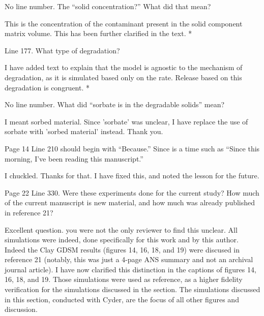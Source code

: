 \documentclass[answers,12pt]{exam}
\begin{document}
\begin{questions}
\question No line number. The ``solid concentration?'' What did that mean?
\begin{solution}
This is the concentration of the contaminant present in the solid component 
        matrix volume. This has been further clarified in the text.
        {\color{red}*}
\end{solution}
 

\question Line 177. What type of degradation?
\begin{solution}
        I have added text to explain that the model is agnostic to the 
        mechanism of degradation, as it is simulated based only 
        on the rate.  Release based on this degradation is congruent.
        {\color{red}*}
\end{solution}

 

\question No line number. What did ``sorbate is in the degradable solids'' mean?
\begin{solution}
I meant sorbed material. Since 'sorbate' was unclear, I have replace the use of 
sorbate with 'sorbed material' instead. Thank you.
\end{solution}
 

\question Page 14 Line 210 should begin with ``Because.'' Since is a time such 
as ``Since this morning, I've been reading this manuscript.''
\begin{solution}
I chuckled. Thanks for that. I have fixed this, and noted the lesson for the future. 
\end{solution}

 

\question Page 22 Line 330. Were these experiments done for the current study? How much of the current manuscript is new material, and how much was already published in reference 21?
\begin{solution}
Excellent question. you were not the only reviewer to find this unclear. All 
        simulations were indeed, done specifically for this work and by this 
        author. Indeed the Clay GDSM results (figures 14, 16, 18, and 19) 
        were discused in reference 21 (notably, this was just a 4-page ANS 
        summary and not an archival journal article).
        I have now clarified this distinction in the captions of 
        figures 14, 16, 18, and 19. Those simulations were used as reference, 
        as a higher fidelity verification for the simulations discussed in the 
        section. The simulations discussed in this section, conducted with 
        Cyder, are the focus of all other figures and discussion. 
\end{solution}


\end{questions}
\end{document}
